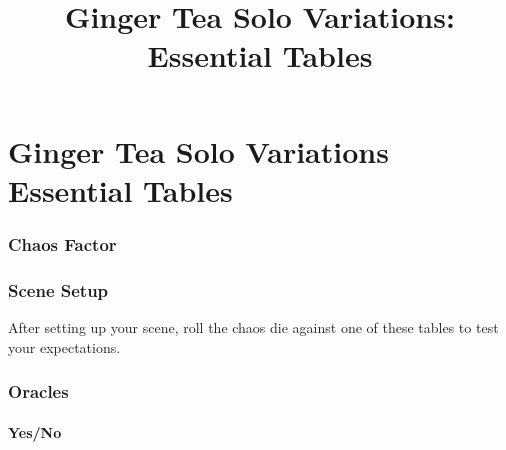 

\title{Ginger Tea Solo Variations: Essential Tables}



\mainmatter
\chapter*{Ginger Tea Solo Variations\hspace*{8cm} Essential Tables \version}
\subsection{Chaos Factor}


\subsection{Scene Setup}
After setting up your scene, roll the chaos die against one of these tables to
test your expectations.




\newpage
\subsection{Oracles}
\subsubsection{Yes/No}


